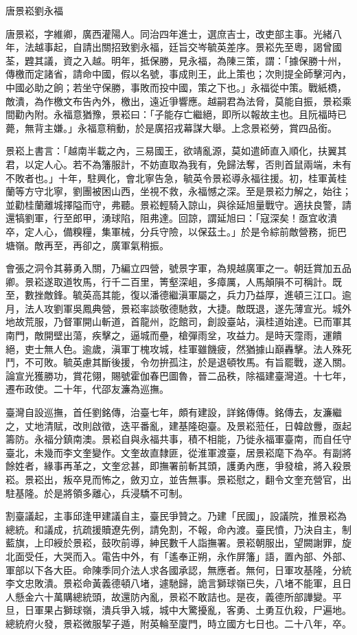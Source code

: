 
\begin{pinyinscope}
唐景崧劉永福

唐景崧，字維卿，廣西灌陽人。同治四年進士，選庶吉士，改吏部主事。光緒八年，法越事起，自請出關招致劉永福，廷旨交岑毓英差序。景崧先至粵，謁曾國荃，韙其議，資之入越。明年，抵保勝，見永福，為陳三策，謂：「據保勝十州，傳檄而定諸省，請命中國，假以名號，事成則王，此上策也；次則提全師擊河內，中國必助之餉；若坐守保勝，事敗而投中國，策之下也。」永福從中策。戰紙橋，敵潰，為作檄文布告內外，檄出，遠近爭響應。越嗣君為法脅，莫能自振，景崧乘間勸內附。永福意猶豫，景崧曰：「子能存亡繼絕，即所以報故主也。且阮福時已薨，無背主嫌。」永福意稍動，於是廣招戎幕謀大舉。上念景崧勞，賞四品銜。

景崧上書言：「越南半載之內，三易國王，欲靖亂源，莫如遣師直入順化，扶翼其君，以定人心。若不為籓服計，不妨直取為我有，免歸法奪，否則首鼠兩端，未有不敗者也。」十年，駐興化，會北寧告急，毓英令景崧導永福往援。初，桂軍黃桂蘭等方守北寧，劉團被困山西，坐視不救，永福憾之深。至是景崧力解之，始往；並勸桂蘭離城擇隘而守，弗聽。景崧輕騎入諒山，與徐延旭量戰守。適扶良警，請還犒劉軍，行至郎甲，湧球陷，阻弗達。回諒，謂延旭曰：「寇深矣！亟宜收潰卒，定人心，備糗糧，集軍械，分兵守險，以保茲土。」於是令綜前敵營務，扼巴塘嶺。敵再至，再卻之，廣軍氣稍振。

會張之洞令其募勇入關，乃編立四營，號景字軍，為規越廣軍之一。朝廷賞加五品卿。景崧遂取道牧馬，行千二百里，箐壑深岨，多瘴厲，人馬顛隕不可稱計。既至，數挫敵鋒。毓英高其能，復以潘德繼滇軍屬之，兵力乃益厚，進頓三江口。逾月，法人攻劉軍吳鳳典營，景崧率談敬德馳救，大捷。敵既退，遂先薄宣光。城外地故荒服，乃督軍開山斬道，首龍州，訖館司，創設臺站，滇桂道始達。已而軍其南門，敵開壁出蕩，疾擊之，逼城而壘，槍彈雨坌，攻益力。是時天霪雨，運饋絕，吏士無人色。逾歲，滇軍丁槐攻城，桂軍雖饑疲，然猶據山巔轟擊。法人殊死鬥，不可敗。毓英慮其斷後援，令勿拚孤注，於是退頓牧馬。有旨罷戰，遂入關。論宣光獲勝功，賞花翎，賜號霍伽春巴圖魯，晉二品秩，除福建臺灣道。十七年，遷布政使。二十年，代邵友濂為巡撫。

臺灣自設巡撫，首任劉銘傳，治臺七年，頗有建設，詳銘傳傳。銘傳去，友濂繼之，丈地清賦，改則啟徵，迭平番亂，建基隆砲臺。及景崧蒞任，日韓啟釁，亟起籌防。永福分鎮南澳。景崧自與永福共事，積不相能，乃徙永福軍臺南，而自任守臺北，未幾而李文奎變作。文奎故直隸匪，從淮軍渡臺，居景崧麾下為卒。有副將餘姓者，緣事再革之，文奎忿甚，即撫署前斬其頭，護勇內應，爭發槍，將入殺景崧。景崧出，叛卒見而怖之，斂刃立，並告無事。景崧慰之，翻令文奎充營官，出駐基隆。於是將領多離心，兵浸驕不可制。

割臺議起，主事邱逢甲建議自主，臺民爭贊之。乃建「民國」，設議院，推景崧為總統。和議成，抗疏援贖遼先例，請免割，不報，命內渡。臺民憤，乃決自主，制藍旗，上印綬於景崧，鼓吹前導，紳民數千人詣撫署。景崧朝服出，望闕謝罪，旋北面受任，大哭而入。電告中外，有「遙奉正朔，永作屏籓」語，置內部、外部、軍部以下各大臣。命陳季同介法人求各國承認，無應者。無何，日軍攻基隆，分統李文忠敗潰。景崧命黃義德頓八堵，遽馳歸，詭言獅球嶺已失，八堵不能軍，且日人懸金六十萬購總統頭，故還防內亂，景崧不敢詰也。是夜，義德所部譁變。平旦，日軍果占獅球嶺，潰兵爭入城，城中大驚擾亂，客勇、土勇互仇殺，尸遍地。總統府火發，景崧微服挈子遁，附英輪至廈門，時立國方七日也。二十八年，卒。


\end{pinyinscope}
